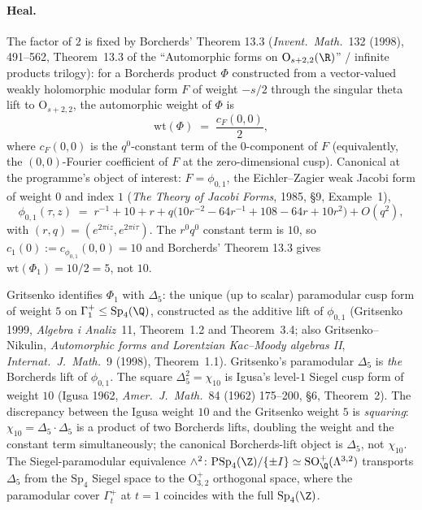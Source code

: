 \paragraph{Heal.} The factor of $2$ is fixed by Borcherds' Theorem
13.3 (\emph{Invent.\ Math.}~132 (1998), 491--562, Theorem~13.3 of
the ``Automorphic forms on $\mathrm{O}_{s + 2, 2}(\R)$'' / infinite
products trilogy): for a Borcherds product $\Phi$ constructed from
a vector-valued weakly holomorphic modular form $F$ of weight
$-s/2$ through the singular theta lift to $\mathrm{O}_{s + 2, 2}$,
the automorphic weight of $\Phi$ is
\[
  \mathrm{wt}(\Phi) \;=\; \frac{c_F(0, 0)}{2},
\]
where $c_F(0, 0)$ is the $q^0$-constant term of the $0$-component
of $F$ (equivalently, the $(0, 0)$-Fourier coefficient of $F$ at the
zero-dimensional cusp). Canonical at the programme's object of
interest: $F = \phi_{0, 1}$, the Eichler--Zagier weak Jacobi form
of weight $0$ and index $1$ (\emph{The Theory of Jacobi Forms}, 1985,
\S9, Example~1),
\[
  \phi_{0, 1}(\tau, z) \;=\; r^{-1} + 10 + r
    + q\bigl(10 r^{-2} - 64 r^{-1} + 108 - 64 r + 10 r^2\bigr)
    + O(q^2),
\]
with $(r, q) = (e^{2\pi i z}, e^{2\pi i \tau})$. The $r^0 q^0$
constant term is $10$, so $c_1(0) := c_{\phi_{0, 1}}(0, 0) = 10$
and Borcherds' Theorem 13.3 gives
$\mathrm{wt}(\Phi_1) = 10/2 = 5$, not $10$.

Gritsenko identifies $\Phi_1$ with $\Delta_5$: the unique (up to
scalar) paramodular cusp form of weight $5$ on
$\Gamma^+_1 \leq \mathrm{Sp}_4(\Q)$, constructed as the additive
lift of $\phi_{0, 1}$ (Gritsenko 1999, \emph{Algebra i Analiz}~11,
Theorem~1.2 and Theorem~3.4; also Gritsenko--Nikulin,
\emph{Automorphic forms and Lorentzian Kac--Moody algebras II},
\emph{Internat.\ J.\ Math.}~9 (1998), Theorem~1.1). Gritsenko's
paramodular $\Delta_5$ is \emph{the} Borcherds lift of
$\phi_{0, 1}$. The square
$\Delta_5^2 = \chi_{10}$ is Igusa's level-$1$ Siegel cusp form of
weight $10$ (Igusa 1962, \emph{Amer.\ J.\ Math.}~84 (1962) 175--200,
\S6, Theorem~2). The discrepancy between the Igusa weight $10$ and
the Gritsenko weight $5$ is \emph{squaring}: $\chi_{10} =
\Delta_5 \cdot \Delta_5$ is a product of two Borcherds lifts,
doubling the weight and the constant term simultaneously; the
canonical Borcherds-lift object is $\Delta_5$, not $\chi_{10}$.
The Siegel-paramodular equivalence
$\wedge^2 \colon \mathrm{PSp}_4(\Z)/\{\pm I\} \simeq
\mathrm{SO}^+_{\Q}(\Lambda^{3, 2})$ transports $\Delta_5$ from
the $\mathrm{Sp}_4$ Siegel space to the $\mathrm{O}^+_{3, 2}$
orthogonal space, where the paramodular cover
$\Gamma^+_t$ at $t = 1$ coincides with the full $\mathrm{Sp}_4(\Z)$.

